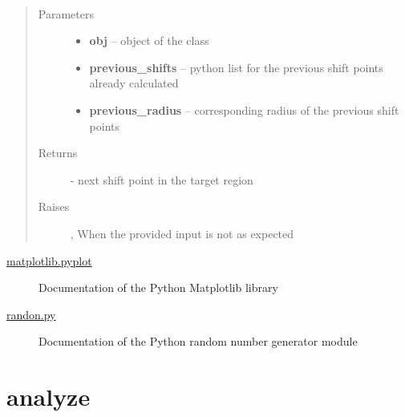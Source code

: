 \documentclass[letterpaper,10pt,english]{sphinxmanual}
\begin{document}
\begin{fulllineitems}
\label{index:brake.solve.cover.next_shift}~\begin{quote}\begin{description}
\item[{Parameters}] \leavevmode\begin{itemize}
\item {} 
\textbf{obj} -- object of the class 

\item {} 
\textbf{previous\_shifts} -- python list for the previous shift points already calculated

\item {} 
\textbf{previous\_radius} -- corresponding radius of the previous shift points

\end{itemize}

\item[{Returns}] \leavevmode
{} - next shift point in the target region

\item[{Raises }] \leavevmode
{}, When the provided input is not as expected

\end{description}\end{quote}

\end{fulllineitems}




\begin{description}
\item[{\href{http://matplotlib.org/api/pyplot\_api.html}{matplotlib.pyplot}}] \leavevmode
Documentation of the Python Matplotlib library

\item[{\href{https://docs.python.org/2/library/random.html}{randon.py}}] \leavevmode
Documentation of the Python random number generator module

\end{description}




\chapter{analyze}
\label{index:analyze}
\end{document}
